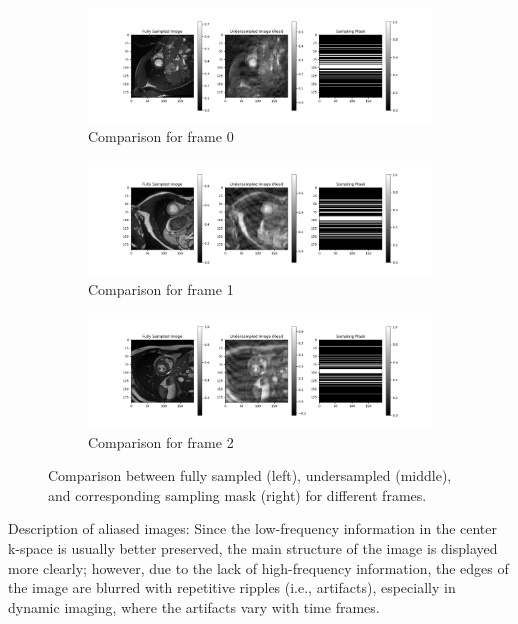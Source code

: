 \documentclass{article}
\begin{document}
\begin{figure}[ht]
  \centering
  \begin{subfigure}[b]{\linewidth}
    \includegraphics[width=\linewidth]{../assets/comparison_image_0.png}
    \caption{Comparison for frame 0}
    \label{fig:comparison_image_0}
  \end{subfigure}
  \quad
  \begin{subfigure}[b]{\linewidth}
    \includegraphics[width=\linewidth]{../assets/comparison_image_1.png}
    \caption{Comparison for frame 1}
    \label{fig:comparison_image_1}
  \end{subfigure}
  \quad
  \begin{subfigure}[b]{\linewidth}
    \includegraphics[width=\linewidth]{../assets/comparison_image_2.png}
    \caption{Comparison for frame 2}
    \label{fig:comparison_image_2}
  \end{subfigure}
  \caption{Comparison between fully sampled (left), undersampled (middle), and corresponding sampling mask (right) for different frames.}
  \label{fig:comparison_images}
\end{figure}

Description of aliased images: Since the low-frequency information in the center k-space
is usually better preserved, the main structure of the image is displayed more clearly;
however, due to the lack of high-frequency information, the edges of the image are
blurred with repetitive ripples (i.e., artifacts), especially in dynamic imaging,
where the artifacts vary with time frames.
\end{document}
